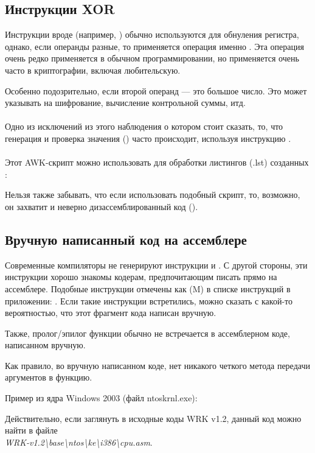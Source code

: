 
\subsection{Инструкции XOR}

Инструкции вроде  (например, ) 
обычно используются для обнуления регистра,
однако, если операнды разные, то применяется операция именно .
Эта операция очень редко применяется в обычном программировании, но применяется очень часто в криптографии,
включая любительскую.

Особенно подозрительно, если второй операнд --- это большое число.
Это может указывать на шифрование, вычисление контрольной суммы, итд.  \\
\\
Одно из исключений из этого наблюдения о котором стоит сказать, то, что генерация и проверка значения 
() часто происходит, используя инструкцию \XOR.  \\
\\
Этот AWK-скрипт можно использовать для обработки листингов (.lst) созданных \IDA{}:



Нельзя также забывать,
что если использовать подобный скрипт, то, возможно, он захватит и неверно дизассемблированный
код 
().

\subsection{Вручную написанный код на ассемблере}

Современные компиляторы не генерируют инструкции  и . 
С другой стороны, эти инструкции хорошо знакомы кодерам, предпочитающим писать прямо на ассемблере. 
Подобные инструкции отмечены как (M) в списке инструкций в приложении: 
.
Если такие инструкции встретились, можно сказать с какой-то вероятностью, что этот фрагмент кода написан вручную.

\par
Также, пролог/эпилог функции обычно не встречается в ассемблерном коде, написанном вручную.

\par
Как правило, во вручную написанном коде, нет никакого четкого метода передачи аргументов в функцию.

\par
Пример из ядра Windows 2003 
(файл ntoskrnl.exe):



Действительно, если заглянуть в исходные коды 
\ac{WRK} v1.2, данный код можно найти в файле \\
\emph{WRK-v1.2\textbackslash{}base\textbackslash{}ntos\textbackslash{}ke\textbackslash{}i386\textbackslash{}cpu.asm}.
